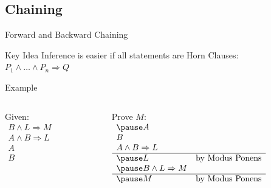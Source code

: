 \documentclass[14pt]{beamer}
\newcommand{\limpl}{\Rightarrow}
\begin{document}
\subsection{Chaining}
\begin{frame}{Forward and Backward Chaining}
	\begin{block}{Key Idea}
		Inference is easier if all statements are \alert{Horn Clauses}: \\
		\hspace{1em} $P_1 \land \ldots \land P_n \limpl Q$ \\
	\end{block}
	\pause
	\begin{block}{Example}
		\begin{columns}[t]
			\begin{column}{1in}
				Given: \\[.2em]
				$
				\begin{array}{l}
					B \land L \limpl M \\
					A \land B \limpl L \\
					A \\
					B
				\end{array}
				$
			\end{column}
			\begin{column}{3in}
				Prove $M$: \\[.2em]
				$
				\begin{array}{ll}
					\pause
					A \\
					B \\
					A \land B \limpl L \\
					\hline
					\pause
					L & \mbox{by Modus Ponens} \\
					\pause
					B \land L \limpl M \\
					\hline
					\pause
					M & \mbox{by Modus Ponens}
				\end{array}
				$
			\end{column}
		\end{columns}
	\end{block}
\end{frame}
\end{document}

